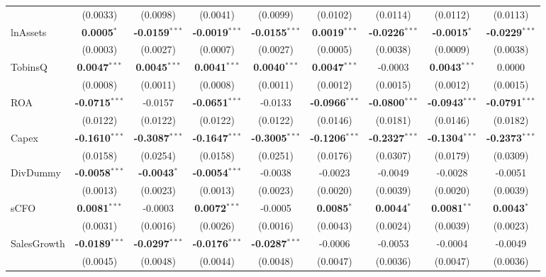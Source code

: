 \documentclass[11pt,a4paper]{article}
\begin{document}
\begin{table}[htbp]
\begin{tabular}{lcccccccc}
 & (0.0033) & (0.0098) & (0.0041) & (0.0099) & (0.0102) & (0.0114) & (0.0112) & (0.0113) \\
lnAssets & \textbf{0.0005}$^{*}$ & \textbf{-0.0159}$^{***}$ & \textbf{-0.0019}$^{***}$ & \textbf{-0.0155}$^{***}$ & \textbf{0.0019}$^{***}$ & \textbf{-0.0226}$^{***}$ & \textbf{-0.0015}$^{*}$ & \textbf{-0.0229}$^{***}$ \\
 & (0.0003) & (0.0027) & (0.0007) & (0.0027) & (0.0005) & (0.0038) & (0.0009) & (0.0038) \\
TobinsQ & \textbf{0.0047}$^{***}$ & \textbf{0.0045}$^{***}$ & \textbf{0.0041}$^{***}$ & \textbf{0.0040}$^{***}$ & \textbf{0.0047}$^{***}$ & -0.0003 & \textbf{0.0043}$^{***}$ & 0.0000 \\
 & (0.0008) & (0.0011) & (0.0008) & (0.0011) & (0.0012) & (0.0015) & (0.0012) & (0.0015) \\
ROA & \textbf{-0.0715}$^{***}$ & -0.0157 & \textbf{-0.0651}$^{***}$ & -0.0133 & \textbf{-0.0966}$^{***}$ & \textbf{-0.0800}$^{***}$ & \textbf{-0.0943}$^{***}$ & \textbf{-0.0791}$^{***}$ \\
 & (0.0122) & (0.0122) & (0.0122) & (0.0122) & (0.0146) & (0.0181) & (0.0146) & (0.0182) \\
Capex & \textbf{-0.1610}$^{***}$ & \textbf{-0.3087}$^{***}$ & \textbf{-0.1647}$^{***}$ & \textbf{-0.3005}$^{***}$ & \textbf{-0.1206}$^{***}$ & \textbf{-0.2327}$^{***}$ & \textbf{-0.1304}$^{***}$ & \textbf{-0.2373}$^{***}$ \\
 & (0.0158) & (0.0254) & (0.0158) & (0.0251) & (0.0176) & (0.0307) & (0.0179) & (0.0309) \\
DivDummy & \textbf{-0.0058}$^{***}$ & \textbf{-0.0043}$^{*}$ & \textbf{-0.0054}$^{***}$ & -0.0038 & -0.0023 & -0.0049 & -0.0028 & -0.0051 \\
 & (0.0013) & (0.0023) & (0.0013) & (0.0023) & (0.0020) & (0.0039) & (0.0020) & (0.0039) \\
sCFO & \textbf{0.0081}$^{***}$ & -0.0003 & \textbf{0.0072}$^{***}$ & -0.0005 & \textbf{0.0085}$^{*}$ & \textbf{0.0044}$^{*}$ & \textbf{0.0081}$^{**}$ & \textbf{0.0043}$^{*}$ \\
 & (0.0031) & (0.0016) & (0.0026) & (0.0016) & (0.0043) & (0.0024) & (0.0039) & (0.0023) \\
SalesGrowth & \textbf{-0.0189}$^{***}$ & \textbf{-0.0297}$^{***}$ & \textbf{-0.0176}$^{***}$ & \textbf{-0.0287}$^{***}$ & -0.0006 & -0.0053 & -0.0004 & -0.0049 \\
 & (0.0045) & (0.0048) & (0.0044) & (0.0048) & (0.0047) & (0.0036) & (0.0047) & (0.0036) \\

\end{tabular}
\end{table}
\end{document}
